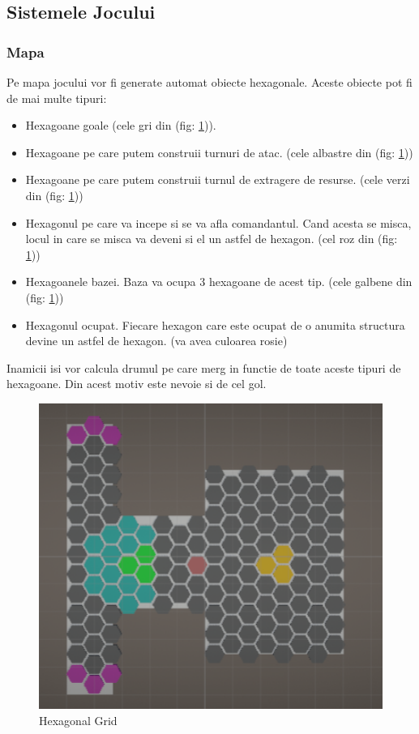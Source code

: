 \documentclass[12pt, a4paper]{article}
\begin{document}
	
	
	\subsection{Sistemele Jocului}
	
	\subsubsection{Mapa}
	
	Pe mapa jocului vor fi generate automat obiecte hexagonale. Aceste obiecte pot fi de mai multe tipuri:
	\begin{itemize}
		\item Hexagoane goale (cele gri din (fig: \ref{fig: gridSystem})).
		\item Hexagoane pe care putem construii turnuri de atac. (cele albastre din (fig: \ref{fig: gridSystem}))
		\item Hexagoane pe care putem construii turnul de extragere de resurse. (cele verzi din (fig: \ref{fig: gridSystem}))
		\item Hexagonul pe care va incepe si se va afla comandantul. Cand acesta se misca, locul in care se misca va deveni si el un astfel de hexagon. (cel roz din (fig: \ref{fig: gridSystem}))
		\item Hexagoanele bazei. Baza va ocupa 3 hexagoane de acest tip. (cele galbene din (fig: \ref{fig: gridSystem}))
		\item Hexagonul ocupat. Fiecare hexagon care este ocupat de o anumita structura devine un astfel de hexagon. (va avea culoarea rosie)
	\end{itemize}

	Inamicii isi vor calcula drumul pe care merg in functie de toate aceste tipuri de hexagoane. Din acest motiv este nevoie si de cel gol.
	
	\begin{figure}[H]
		\centering
		\includegraphics[width=1\textwidth]{grid.png}
		\caption{Hexagonal Grid}
		\label{fig: gridSystem}
	\end{figure}
\end{document}

